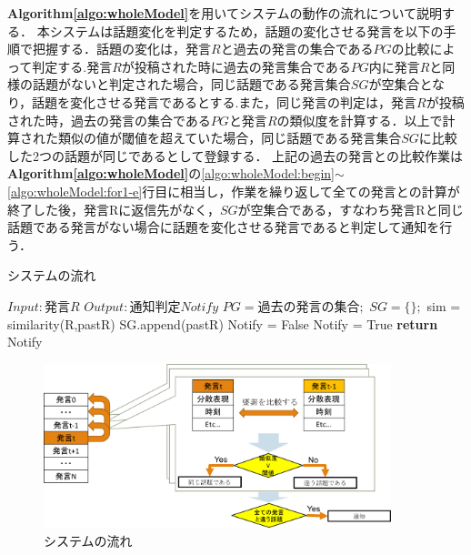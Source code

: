 \textbf{Algorithm\ref{algo:wholeModel}}を用いてシステムの動作の流れについて説明する．
本システムは話題変化を判定するため，話題の変化させる発言を以下の手順で把握する．話題の変化は，発言$R$と過去の発言の集合である$PG$の比較によって判定する.発言$R$が投稿された時に過去の発言集合である$PG$内に発言$R$と同様の話題がないと判定された場合，同じ話題である発言集合$SG$が空集合となり，話題を変化させる発言であるとする.また，同じ発言の判定は，発言$R$が投稿された時，過去の発言の集合である$PG$と発言$R$の類似度を計算する．以上で計算された類似の値が閾値を超えていた場合，同じ話題である発言集合$SG$に比較した2つの話題が同じであるとして登録する．
上記の過去の発言との比較作業は\textbf{Algorithm\ref{algo:wholeModel}}の\ref{algo:wholeModel:begin}$\sim$\ref{algo:wholeModel:for1-e}行目に相当し，作業を繰り返して全ての発言との計算が終了した後，発言Rに返信先がなく，$SG$が空集合である，すなわち発言Rと同じ話題である発言がない場合に話題を変化させる発言であると判定して通知を行う．
\begin{algorithm}
\caption{システムの流れ} \label{algo:wholeModel}
\begin{algorithmic}[1]
\State $Input:  発言R$
\State $Output: 通知判定Notify$
\State $PG = 過去の発言の集合;$%
	\State $SG = \{\};$\label{algo:wholeModel:begin}%
	 \label{algo:wholeModel:for1-b}
	 	\State sim = similarity(R,pastR)
			\State SG.append(pastR)
		\EndIf
	 \EndFor\label{algo:wholeModel:for1-e}
	 \State Notify = False
		\State Notify = True
	\EndIf
	\State \textbf{return} Notify
\EndProcedure
\end{algorithmic}
\end{algorithm}
\begin{figure}[htbp]
 \begin{center}
  \includegraphics[width=0.9\textwidth]{../images/3.The_Model/WholeModel.png}
  \caption{システムの流れ}
  \label{Fig:wholeModel}
  \vspace{-10pt}
 \end{center}
\end{figure}

